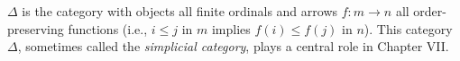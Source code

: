 $\Delta$ is the category with objects all finite ordinals and arrows $f : m \to n$ all order-preserving functions (i.e., $i \leq j$ in $m$ implies $f(i) \leq f(j)$ in $n$). This category $\Delta$, sometimes called the \emph{simplicial category}, plays a central role in Chapter VII.
